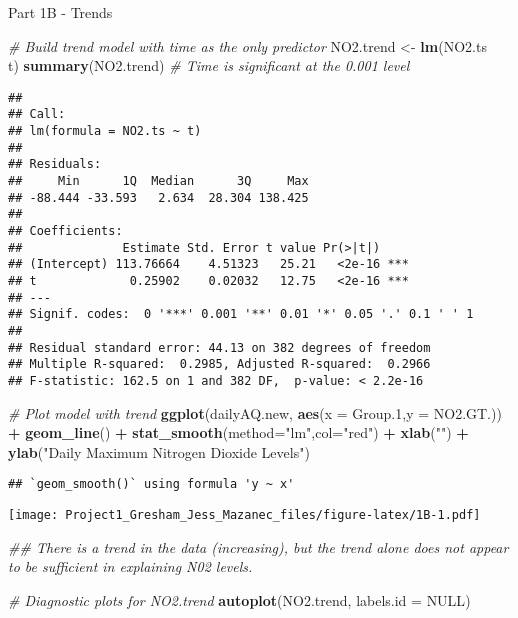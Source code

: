 \documentclass[
]{article}
\newenvironment{Shaded}{\begin{snugshade}}{\end{snugshade}}
\newcommand{\CommentTok}[1]{\textcolor[rgb]{0.56,0.35,0.01}{\textit{#1}}}
\newcommand{\DataTypeTok}[1]{\textcolor[rgb]{0.13,0.29,0.53}{#1}}
\newcommand{\FloatTok}[1]{\textcolor[rgb]{0.00,0.00,0.81}{#1}}
\newcommand{\KeywordTok}[1]{\textcolor[rgb]{0.13,0.29,0.53}{\textbf{#1}}}
\newcommand{\NormalTok}[1]{#1}
\newcommand{\OperatorTok}[1]{\textcolor[rgb]{0.81,0.36,0.00}{\textbf{#1}}}
\newcommand{\OtherTok}[1]{\textcolor[rgb]{0.56,0.35,0.01}{#1}}
\newcommand{\StringTok}[1]{\textcolor[rgb]{0.31,0.60,0.02}{#1}}
\begin{document}
Part 1B - Trends

\begin{Shaded}
\begin{Highlighting}[]
\CommentTok{# Build trend model with time as the only predictor}
\NormalTok{NO2.trend <-}\StringTok{ }\KeywordTok{lm}\NormalTok{(NO2.ts }\OperatorTok{~}\StringTok{ }\NormalTok{t)}
\KeywordTok{summary}\NormalTok{(NO2.trend) }\CommentTok{# Time is significant at the 0.001 level}
\end{Highlighting}
\end{Shaded}

\begin{verbatim}
## 
## Call:
## lm(formula = NO2.ts ~ t)
## 
## Residuals:
##     Min      1Q  Median      3Q     Max 
## -88.444 -33.593   2.634  28.304 138.425 
## 
## Coefficients:
##              Estimate Std. Error t value Pr(>|t|)    
## (Intercept) 113.76664    4.51323   25.21   <2e-16 ***
## t             0.25902    0.02032   12.75   <2e-16 ***
## ---
## Signif. codes:  0 '***' 0.001 '**' 0.01 '*' 0.05 '.' 0.1 ' ' 1
## 
## Residual standard error: 44.13 on 382 degrees of freedom
## Multiple R-squared:  0.2985, Adjusted R-squared:  0.2966 
## F-statistic: 162.5 on 1 and 382 DF,  p-value: < 2.2e-16
\end{verbatim}

\begin{Shaded}
\begin{Highlighting}[]
\CommentTok{# Plot model with trend}
\KeywordTok{ggplot}\NormalTok{(dailyAQ.new, }\KeywordTok{aes}\NormalTok{(}\DataTypeTok{x =}\NormalTok{ Group}\FloatTok{.1}\NormalTok{,}\DataTypeTok{y =}\NormalTok{ NO2.GT.)) }\OperatorTok{+}\StringTok{ }\KeywordTok{geom_line}\NormalTok{() }\OperatorTok{+}
\StringTok{  }\KeywordTok{stat_smooth}\NormalTok{(}\DataTypeTok{method=}\StringTok{"lm"}\NormalTok{,}\DataTypeTok{col=}\StringTok{"red"}\NormalTok{) }\OperatorTok{+}\StringTok{ }\KeywordTok{xlab}\NormalTok{(}\StringTok{""}\NormalTok{) }\OperatorTok{+}\StringTok{ }\KeywordTok{ylab}\NormalTok{(}\StringTok{"Daily Maximum Nitrogen Dioxide Levels"}\NormalTok{)}
\end{Highlighting}
\end{Shaded}

\begin{verbatim}
## `geom_smooth()` using formula 'y ~ x'
\end{verbatim}

\texttt{[image: Project1\_Gresham\_Jess\_Mazanec\_files/figure-latex/1B-1.pdf]}

\begin{Shaded}
\begin{Highlighting}[]
\CommentTok{## There is a trend in the data (increasing), but the trend alone does not appear to be sufficient in explaining N02 levels.}

\CommentTok{# Diagnostic plots for NO2.trend}
\KeywordTok{autoplot}\NormalTok{(NO2.trend, }\DataTypeTok{labels.id =} \OtherTok{NULL}\NormalTok{)}
\end{Highlighting}
\end{Shaded}
\end{document}

